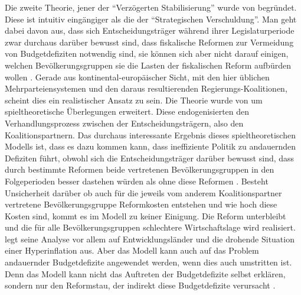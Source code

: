 Die zweite Theorie, jener der "`Verzögerten Stabilisierung"' wurde von \textcite{Alesina1991} begründet. Diese ist intuitiv eingängiger als die der "`Strategischen Verschuldung"'. Man geht dabei davon aus, dass sich Entscheidungsträger während ihrer Legislaturperiode zwar durchaus darüber bewusst sind, dass fiskalische Reformen zur Vermeidung von Budgetdefiziten notwendig sind, sie können sich aber nicht darauf einigen, welchen Bevölkerungsgruppen sie die Lasten der fiskalischen Reform aufbürden wollen \parencite[S. 691]{Romer2019}. Gerade aus kontinental-europäischer Sicht, mit den hier üblichen Mehrparteiensystemen und den daraus resultierenden Regierungs-Koalitionen, scheint dies ein realistischer Ansatz zu sein. Die Theorie wurde von \textcite{Hsieh2000} um spieltheoretische Überlegungen erweitert. Diese endogenisierten den Verhandlungsprozess zwischen der Entscheidungsträgern, also den Koalitionspartnern. Das durchaus interessante Ergebnis dieses spieltheoretischen Modells ist, dass es dazu kommen kann, dass ineffiziente Politik zu andauernden Defiziten führt, obwohl sich die Entscheidungsträger darüber bewusst sind, dass durch bestimmte Reformen beide vertretenen Bevölkerungsgruppen in den Folgeperioden besser dastehen würden als ohne diese Reformen \parencite[S. 164]{Hsieh2000}. Besteht Unsicherheit darüber ob auch für die jeweils vom anderem Koalitionspartner vertretene Bevölkerungsgruppe Reformkosten entstehen und wie hoch diese Kosten sind, kommt es im Modell zu keiner Einigung. Die Reform unterbleibt und die für alle Bevölkerungsgruppen schlechtere Wirtschaftslage wird realisiert. \textcite{Hsieh2000} legt seine Analyse vor allem auf Entwicklungsländer und die drohende Situation einer Hyperinflation aus. Aber das Modell kann auch auf das Problem andauernder Budgetdefizite angewendet werden, wenn dies auch umstritten ist. Denn das Modell kann nicht das Auftreten der Budgetdefizite selbst erklären, sondern nur den Reformstau, der indirekt diese Budgetdefizite verursacht \parencite[S. 695]{Romer2019}. 

